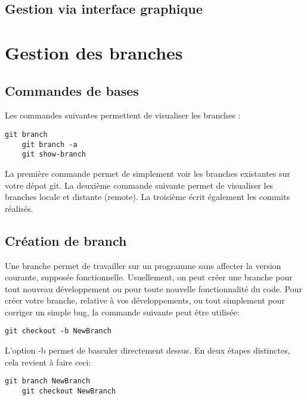 \documentclass[a4paper,11pt]{article}
\begin{document}
	\subsection{Gestion via interface graphique}

\section{Gestion des branches}

	\subsection{Commandes de bases}

	Les commandes suivantes permettent de visualiser les branches :
	\bigskip

	\begin{lstlisting}[style=BashInputStyle]
	git branch
	git branch -a
	git show-branch
	\end{lstlisting}
	\bigskip

	La première commande permet de simplement voir les branches existantes sur votre dépot git. La deuxième commande suivante permet de visualiser les branches locale et distante (remote). La troisième écrit également les commits réalisés.

	\subsection{Création de branch}

	Une branche permet de travailler sur un programme sans affecter la version courante, supposée fonctionnelle. Usuellement, on peut créer une branche pour tout nouveau développement ou pour toute nouvelle fonctionnalité du code. Pour créer votre branche, relative à vos développements, ou tout simplement pour corriger un simple bug, la commande suivante peut être utilisée:
	\bigskip
	
	\begin{lstlisting}[style=BashInputStyle]
	git checkout -b NewBranch
	\end{lstlisting}
	\bigskip
	
	L'option -b permet de basculer directement dessus. En deux étapes distinctes, cela revient à faire ceci:
	\bigskip

	\begin{lstlisting}[style=BashInputStyle]
	git branch NewBranch
	git checkout NewBranch
	\end{lstlisting}
	\bigskip
\end{document}
